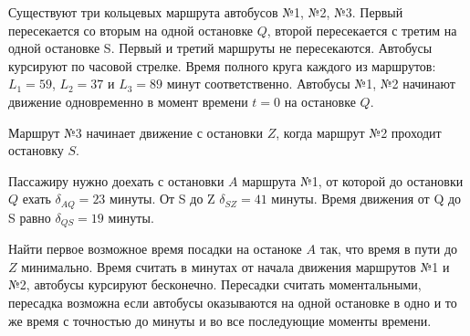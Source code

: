 
Существуют три кольцевых маршрута автобусов №1, №2, №3. Первый пересекается со вторым на одной остановке $Q$, второй пересекается с третим на одной остановке S. Первый и третий маршруты не пересекаются. Автобусы курсируют по часовой стрелке. Время полного круга каждого из маршрутов: $L_1 = 59$, $L_2 = 37$ и $L_3 = 89$ минут соответственно. Автобусы №1, №2 начинают движение одновременно в момент времени $t=0$ на остановке $Q$.  

Маршрут №3 начинает движение с остановки $Z$, когда маршрут №2 проходит остановку $S$.

Пассажиру нужно доехать с остановки $A$ маршрута №1, от которой до остановки $Q$ ехать $\delta_{AQ} = 23$ минуты. От S до Z $\delta_{SZ} = 41$ минуты. Время движения от Q до S равно $\delta_{QS} = 19$ минуты. 

Найти первое возможное время посадки на останоке $A$ так, что время в пути до $Z$ минимально. Время считать в минутах от начала движения маршрутов №1 и №2, автобусы курсируют бесконечно. Пересадки считать моментальными, пересадка возможна если автобусы оказываются на одной остановке в одно и то же время с точностью до минуты и во все последующие моменты времени.